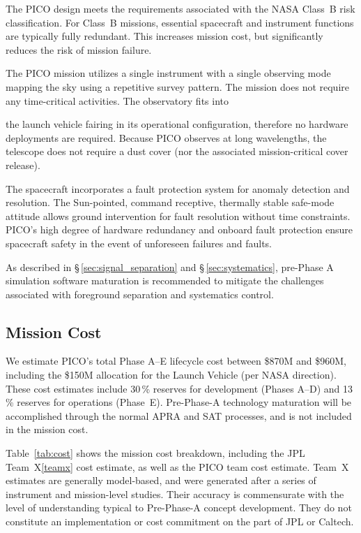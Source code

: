 The PICO design meets the requirements associated with the NASA Class~B risk classification. For Class~B missions, essential spacecraft and instrument functions are typically fully redundant. This increases mission cost, but significantly reduces the risk of mission failure.

The PICO mission utilizes a single instrument with a single observing mode mapping the sky using a repetitive survey pattern. The mission does not require any time-critical activities. The observatory fits into 
 
the launch vehicle fairing in its operational configuration, therefore no hardware deployments are required. 
Because PICO observes at long wavelengths, the telescope does not require a dust cover (nor the associated mission-critical cover release).

The spacecraft incorporates a fault protection system for anomaly
detection and resolution. The Sun-pointed, command receptive,
thermally stable safe-mode attitude allows ground intervention for
fault resolution without time constraints. PICO's high degree of
hardware redundancy and onboard fault protection ensure spacecraft
safety in the event of unforeseen failures and faults.

As described in \S\,\ref{sec:signal_separation} and
\S\,\ref{sec:systematics}, pre-Phase A simulation software maturation
is recommended to mitigate the challenges associated with foreground
separation and systematics control.


\subsection{Mission Cost}
\label{sec:mission_cost} %
%
%

We estimate PICO's total Phase A--E lifecycle cost between \$870M and \$960M, including the \$150M allocation for the Launch Vehicle (per NASA direction). These cost estimates include 30\,\% reserves for development (Phases A--D) and 13\,\% reserves for operations (Phase~E). Pre-Phase-A technology maturation 
will be accomplished through the normal APRA and SAT processes, and is not included in the mission cost. 

Table~\ref{tab:cost} shows the mission cost breakdown, including the JPL Team~X\cref{teamx} cost estimate, as well as the PICO team cost estimate. Team~X estimates are generally model-based, and were generated after a series of instrument and mission-level studies. Their accuracy is commensurate with the level of understanding typical to Pre-Phase-A concept development. They do not constitute an implementation or cost commitment on the part of JPL or Caltech.

